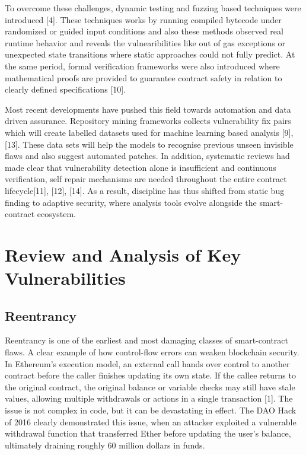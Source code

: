 \documentclass[conference]{IEEEtran}
\begin{document}
To overcome these challenges, dynamic testing and fuzzing based techniques were introduced [4]. These techniques works by running compiled bytecode under randomized  or guided input conditions and also these methods observed real runtime behavior and reveals the vulnearibilities like out of gas exceptions or unexpected state transitions where static approaches could not fully predict. At the same period, formal verification frameworks were also introduced where mathematical proofs are provided to  guarantee contract safety in relation to clearly defined specifications [10].

Most recent developments have pushed this field towards automation and data driven assurance. Repository mining frameworks collects vulnerability fix pairs which will create labelled datasets used for machine learning based analysis [9], [13]. These data sets will help the models to recognise previous unseen invisible flaws and also suggest automated patches. In addition, systematic reviews had made clear that vulnerability detection alone is insufficient and continuous verification, self repair mechanisms are needed throughout the entire contract lifecycle[11], [12], [14]. As a result, discipline has thus shifted from static bug finding to adaptive security, where analysis tools evolve alongside the smart-contract ecosystem.

\section{Review and Analysis of Key Vulnerabilities}

\subsection{Reentrancy}
Reentrancy is one of the earliest and most damaging classes 
of smart-contract flaws. A clear example of how control-flow 
errors can weaken blockchain security. In Ethereum’s execution
model, an external call hands over control to another contract 
before the caller finishes updating its own state. If the callee 
returns to the original contract, the original balance or variable 
checks may still have stale values, allowing multiple withdrawals 
or actions in a single transaction [1]. The issue is not complex in 
code, but it can be devastating in effect. The DAO Hack of 2016 
clearly demonstrated this issue, when an attacker exploited a 
vulnerable withdrawal function that transferred Ether before 
updating the user’s balance, ultimately draining roughly 60 million dollars in funds.
\end{document}
